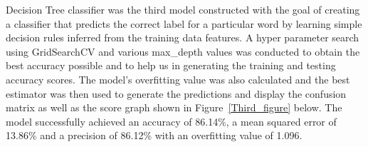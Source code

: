 \documentclass[10pt,twocolumn,letterpaper]{article}
\begin{document}
\begin{figure}[h]
\begin{center}
   \end{center}
        \vspace*{-5mm}
        \caption{\label{Second_figure}}
\end{figure}

Decision Tree classifier was the third model constructed with the goal of creating a classifier that predicts the correct label for a particular word by learning simple decision rules inferred from the training data features. A hyper parameter search using GridSearchCV and various max\_depth values was conducted to obtain the best accuracy possible and to help us in generating the training and testing accuracy scores. The model's overfitting value was also calculated and the best estimator was then used to generate the predictions and display the confusion matrix as well as the score graph shown in Figure~\ref{Third_figure} below. The model successfully achieved an accuracy of 86.14\%, a mean squared error of 13.86\% and a precision of 86.12\% with an overfitting value of 1.096.
 
\end{document}
